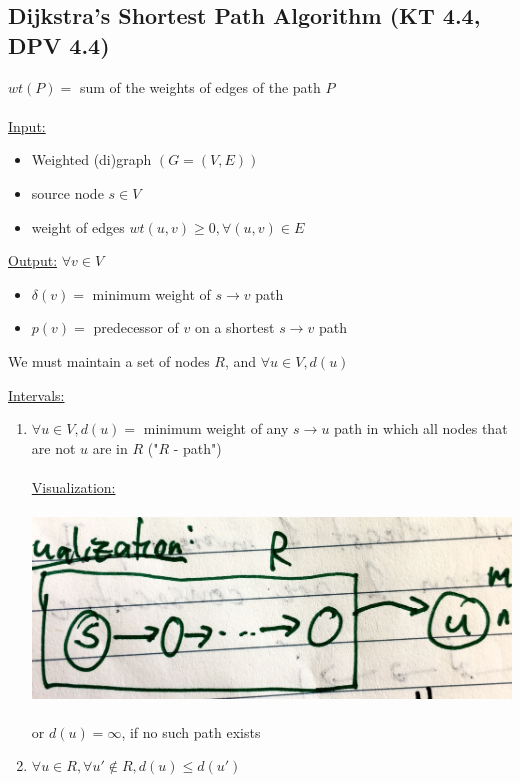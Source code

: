 \documentclass[12pt]{article}
\begin{document}
\subsection{Dijkstra's Shortest Path Algorithm (KT 4.4, DPV 4.4)}

$wt(P) = $ sum of the weights of edges of the path $P$\\
\\
\underline{Input:} 
\begin{itemize}
	\item{Weighted (di)graph $(G=(V,E))$}
	\item{source node $s\in V$}
	\item{weight of edges $wt(u,v) \geq 0, \forall (u,v) \in E$}
\end{itemize}

\underline{Output:} $\forall v \in V$
\begin{itemize}
	\item{$\delta (v) = $ minimum weight of $s \rightarrow v$ path}
	\item{$p(v) = $ predecessor of $v$ on a shortest $s \rightarrow v$ path}
\end{itemize}

We must maintain a set of nodes $R$, and $\forall u\in V, d(u)$

\underline{Intervals:}
\begin{enumerate}
	\item{$\forall u\in V, d(u) = $ minimum weight of any $s \rightarrow u$ path in which all nodes that are not $u$ are in $R$ ("$R$ - path")\\
	\\
	\underline{Visualization:}\\
	\\
	\includegraphics[scale=0.125]{visual}
	\\
	\\
	or $d(u) = \infty$, if no such path exists}
	\item{$\forall u \in R, \forall u' \not\in R, d(u) \leq d(u')$}
\end{enumerate}
\end{document}
